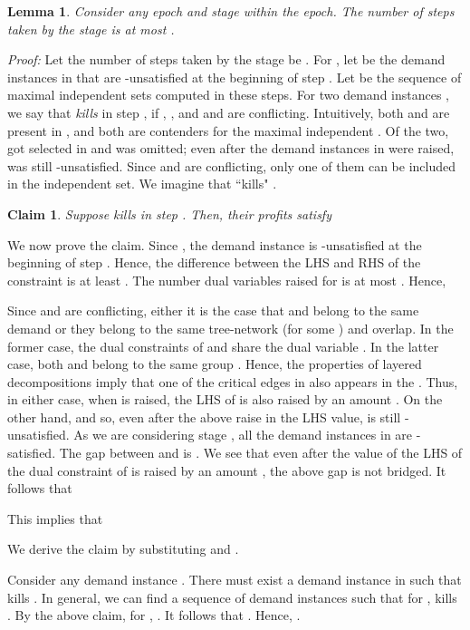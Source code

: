 \documentclass[11pt]{article}
\newtheorem{lemma}[theorem]{\bf Lemma}
\newtheorem{claim}[theorem]{\bf Claim}
\newcommand{\qed} {\hfill}
\newcommand{\proof} {{\it Proof: }}
\begin{document}
\begin{lemma}
\label{lem:EEE}
Consider any epoch  and stage  within the epoch.
The number of steps taken by the stage is at most .
\end{lemma}
\proof
Let the number of steps taken by the stage be .
For , let  be the demand instances in  that
are -unsatisfied at the beginning of step .
Let  be the sequence of maximal independent sets computed in these steps.
For two demand instances , we say that  {\em kills}  in step ,
if , , and  and  are conflicting.
Intuitively, both  and  are present in , and both are contenders for the maximal independent .
Of the two,  got selected in  and  was omitted;
even after the demand instances in  were raised,  was still -unsatisfied.
Since  and  are conflicting, only one of them can be included in the independent set. 
We imagine that  ``kills" .

\begin{claim}
Suppose  kills  in step . Then, their profits satisfy 
\end{claim}

We now prove the claim. Since , the demand instance is -unsatisfied
at the beginning of step . Hence, the difference between the LHS and RHS 
of the constraint is at least . The number dual variables raised for  is at most .
Hence, 

Since  and  are conflicting, either it is the case that  and  belong to the same demand 
or they belong to the same tree-network  (for some ) and overlap. 
In the former case, the dual constraints of  and  share the dual variable .
In the latter case, both  and  belong to the same group . 
Hence, the properties of layered decompositions imply that
one of the critical edges in  also appears in the .
Thus, in either case, when  is raised, the LHS of  is also raised by an amount .
On the other hand,  and so, even after the above raise in the LHS value,
 is still -unsatisfied. As we are considering stage ,
all the demand instances in  are -satisfied.
The gap between  and  is .
We see that even after the value of the LHS of the dual constraint of  is raised by an amount ,
the above gap is not bridged.  It follows that 

This implies that

We derive the claim by substituting  and .

Consider any demand instance . There must exist a demand instance  in 
such that  kills . In general, we can find a sequence of demand instances
 such that for ,  kills .
By the above claim, for , .
It follows that . 
Hence, .
\qed
\end{document}
